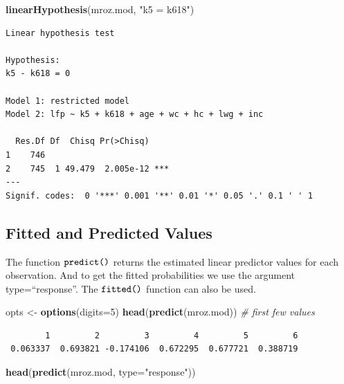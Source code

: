 \documentclass[
]{article}
\newenvironment{Shaded}{\begin{snugshade}}{\end{snugshade}}
\newcommand{\CommentTok}[1]{\textcolor[rgb]{0.56,0.35,0.01}{\textit{#1}}}
\newcommand{\DataTypeTok}[1]{\textcolor[rgb]{0.13,0.29,0.53}{#1}}
\newcommand{\DecValTok}[1]{\textcolor[rgb]{0.00,0.00,0.81}{#1}}
\newcommand{\KeywordTok}[1]{\textcolor[rgb]{0.13,0.29,0.53}{\textbf{#1}}}
\newcommand{\NormalTok}[1]{#1}
\newcommand{\StringTok}[1]{\textcolor[rgb]{0.31,0.60,0.02}{#1}}
\begin{document}
\begin{Shaded}
\begin{Highlighting}[]
\KeywordTok{linearHypothesis}\NormalTok{(mroz.mod, }\StringTok{"k5 = k618"}\NormalTok{)}
\end{Highlighting}
\end{Shaded}

\begin{verbatim}
Linear hypothesis test

Hypothesis:
k5 - k618 = 0

Model 1: restricted model
Model 2: lfp ~ k5 + k618 + age + wc + hc + lwg + inc

  Res.Df Df  Chisq Pr(>Chisq)    
1    746                         
2    745  1 49.479  2.005e-12 ***
---
Signif. codes:  0 '***' 0.001 '**' 0.01 '*' 0.05 '.' 0.1 ' ' 1
\end{verbatim}

\hypertarget{fitted-and-predicted-values}{%
\subsection{Fitted and Predicted
Values}\label{fitted-and-predicted-values}}

The function \(\verb+predict()+\) returns the estimated linear predictor
values for each observation. And to get the fitted probabilities we use
the argument type=``response''. The \(\verb+fitted()+\) function can
also be used.

\begin{Shaded}
\begin{Highlighting}[]
\NormalTok{opts <-}\StringTok{ }\KeywordTok{options}\NormalTok{(}\DataTypeTok{digits=}\DecValTok{5}\NormalTok{)}
\KeywordTok{head}\NormalTok{(}\KeywordTok{predict}\NormalTok{(mroz.mod)) }\CommentTok{# first few values}
\end{Highlighting}
\end{Shaded}

\begin{verbatim}
        1         2         3         4         5         6 
 0.063337  0.693821 -0.174106  0.672295  0.677721  0.388719 
\end{verbatim}

\begin{Shaded}
\begin{Highlighting}[]
\KeywordTok{head}\NormalTok{(}\KeywordTok{predict}\NormalTok{(mroz.mod, }\DataTypeTok{type=}\StringTok{"response"}\NormalTok{))}
\end{Highlighting}
\end{Shaded}
\end{document}

